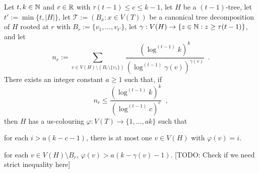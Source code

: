\documentclass[kpfonts]{patmorin}
\theoremstyle{named}
\begin{document}
\begin{lem}\label{t-tree-no-slack}
    Let $t,k\in\mathbb{N}$ and $c\in\mathbb{R}$  with $\tau(t-1)\le c\le k-1$, let $H$ be a $(t-1)$-tree, let $t':=\min\{t,|H|\}$, let $\mathcal{T}:=(B_x:x\in V(T))$ be a canonical tree decomposition of $H$ rooted at $r$ with $B_r:=\{v_1,\ldots,v_{t'}\}$, let $\gamma:V(H)\to\{z\in\mathbb{N}: z\ge \tau(t-1)\}$, and let
    \[
        n_r:=\sum_{v\in V(H)\setminus (B_r\setminus\{v_1\})} \frac{(\log^{(t-1)} k)^k}{(\log^{(t-1)} \gamma(v))^{\gamma(v)}} \enspace .
    \]
    There exists an integer constant $a\ge 1$ such that,
    if
    \begin{equation}
         n_r \le \frac{(\log^{(t-1)} k)^k}{(\log^{(t-1)} c)^{c}} \enspace ,
     \label{total-weight-ii}
    \end{equation}
    then $H$ has a us-colouring $\varphi:V(T)\to\{1,\ldots,ak\}$ such that
    \begin{compactenum}[(P1)]
        \item for each $i>a(k-c-1)$, there is at most one $v\in V(H)$ with $\varphi(v)=i$.
        \item for each $v\in V(H)\setminus B_r$, $\varphi(v)> a(k-\gamma(v)-1)$.  [TODO: Check if we need strict inequality here]
    \end{compactenum}
\end{lem}
\end{document}
